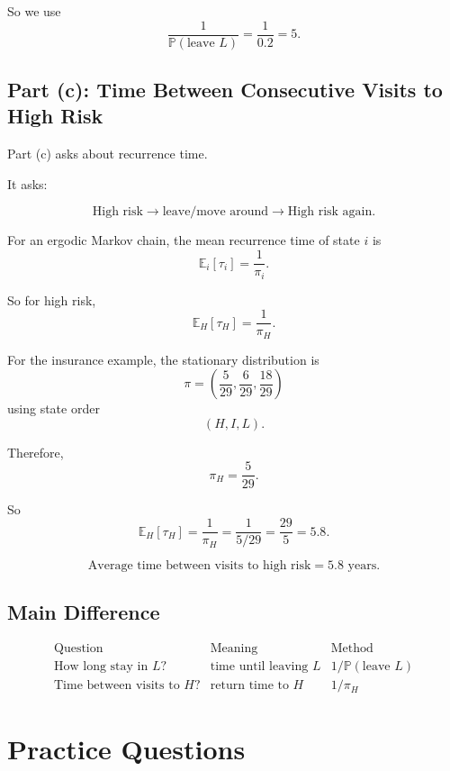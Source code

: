 \documentclass[12pt,a4paper]{article}
\theoremstyle{notestyle}
\newcommand{\Prob}{\mathbb{P}}
\newcommand{\E}{\mathbb{E}}
\begin{document}
So we use
\[
\frac1{\Prob(\text{leave }L)}
=
\frac1{0.2}
=5.
\]

\subsection{Part (c): Time Between Consecutive Visits to High Risk}

Part (c) asks about recurrence time.

It asks:

\[
\text{High risk}\to \text{leave/move around}\to \text{High risk again}.
\]

For an ergodic Markov chain, the mean recurrence time of state $i$ is
\[
\E_i[\tau_i]=\frac1{\pi_i}.
\]

So for high risk,
\[
\E_H[\tau_H]=\frac1{\pi_H}.
\]

For the insurance example, the stationary distribution is
\[
\pi=\left(\frac5{29},\frac6{29},\frac{18}{29}\right)
\]
using state order
\[
(H,I,L).
\]

Therefore,
\[
\pi_H=\frac5{29}.
\]

So
\[
\E_H[\tau_H]
=
\frac1{\pi_H}
=
\frac1{5/29}
=
\frac{29}{5}
=5.8.
\]

\[
\boxed{\text{Average time between visits to high risk}=5.8\text{ years}.}
\]

\subsection{Main Difference}

\[
\begin{array}{c|c|c}
\text{Question} & \text{Meaning} & \text{Method}\\
\hline
\text{How long stay in }L? & \text{time until leaving }L & 1/\Prob(\text{leave }L)\\
\text{Time between visits to }H? & \text{return time to }H & 1/\pi_H
\end{array}
\]

\section{Practice Questions}
\end{document}
